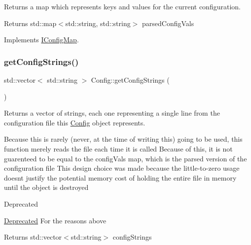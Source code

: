 Returns a map which represents keys and values for the current configuration. 

\begin{DoxyReturn}{Returns}
std\+::map$<$std\+::string, std\+::string$>$ parsed\+Config\+Vals 
\end{DoxyReturn}


Implements \mbox{\hyperlink{classIConfigMap}{I\+Config\+Map}}.

\mbox{\label{classConfig_a1b377e4ec37a758532aa66dce2b2adb2}} 
\subsubsection{\texorpdfstring{getConfigStrings()}{getConfigStrings()}}
{\footnotesize\ttfamily std\+::vector$<$ std\+::string $>$ Config\+::get\+Config\+Strings (\begin{DoxyParamCaption}{ }\end{DoxyParamCaption})}



Returns a vector of strings, each one representing a single line from the configuration file this \mbox{\hyperlink{classConfig}{Config}} object represents. 

Because this is rarely (never, at the time of writing this) going to be used, this function merely reads the file each time it is called Because of this, it is not guarenteed to be equal to the config\+Vals map, which is the parsed version of the configuration file This design choice was made because the little-\/to-\/zero usage doesn\textquotesingle{}t justify the potential memory cost of holding the entire file in memory until the object is destroyed

\begin{DoxyRefDesc}{Deprecated}
\item[\mbox{\hyperlink{deprecated__deprecated000001}{Deprecated}}]For the reasons above\end{DoxyRefDesc}


\begin{DoxyReturn}{Returns}
std\+::vector$<$std\+::string$>$ config\+Strings 
\end{DoxyReturn}
\mbox{\label{classConfig_a6c2d84c1fd4a4720fc7785bb9ab6bd65}} 

